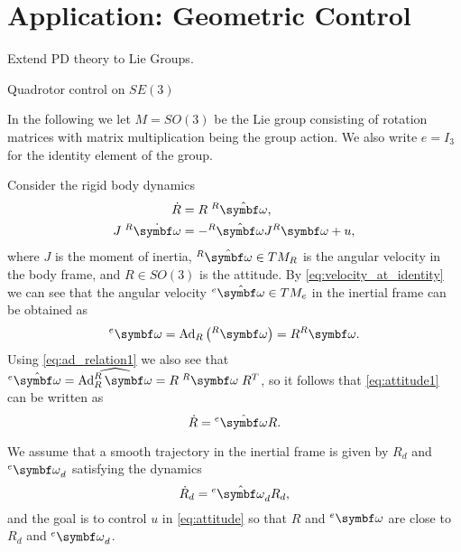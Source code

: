 

\chapter{Application: Geometric Control}

\begin{itemize_outcomes}
  \item Extend PD theory to Lie Groups.
  \item Quadrotor control on $SE(3)$
\end{itemize_outcomes}


In the following we let $M = SO(3)$ be the Lie group consisting of rotation matrices with matrix multiplication being the group action. We also write $e = I_3$ for the identity element of the group.

Consider the rigid body dynamics
\begin{subequations}
  \label{eq:attitude}
  \begin{align}
    \label{eq:attitude1} \dot R                 & = R \; {^R\hat \bomega},              \\
    \label{eq:attitude2} J \; {^R\dot{\bomega}} & = -{^R\hat\bomega} J {^R\bomega} + u,
  \end{align}
\end{subequations}
where $J$ is the moment of inertia, ${^R \hat \bomega} \in T M_R$ is the angular velocity in the body frame, and $R \in SO(3)$ is the attitude. By \eqref{eq:velocity_at_identity} we can see that the angular velocity ${^{e} \hat\bomega} \in T M_{e}$ in the inertial frame can be obtained as
\begin{equation}
  ^{e} \bomega = \Ad_R \left( ^R\bomega \right) = R {^R\bomega}.
\end{equation}
Using \eqref{eq:ad_relation1} we also see that $^e \hat\bomega = \widehat {\Ad_R ^R\bomega } = R  \; {^R\bomega} \; R^T$, so it follows that \eqref{eq:attitude1} can be written as
\begin{equation}
  \dot R = {^e\hat\bomega} R.
\end{equation}

We assume that a smooth trajectory in the inertial frame is given by $R_d$ and $^e \bomega_d$ satisfying the dynamics
\begin{equation}
  \label{eq:desired_dyn}
  \dot R_d = {^e \hat \bomega_d} R_d,
\end{equation}
and the goal is to control $u$ in \eqref{eq:attitude} so that $R$ and $^e\bomega$ are close to $R_d$ and $^e\bomega_d$.

